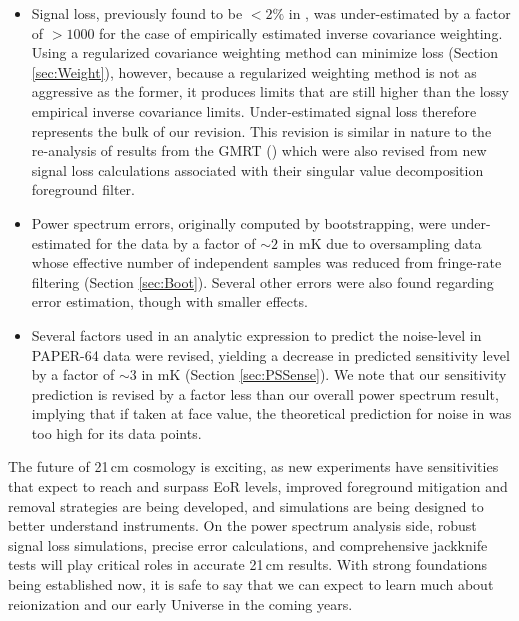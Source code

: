\documentclass[preprint2,numberedappendix,tighten]{aastex6}  %
\begin{document}
\begin{itemize}
\item Signal loss, previously found to be $<2\%$ in , was under-estimated by a factor of $>$$1000$ for the case of empirically estimated inverse 
covariance weighting. Using a regularized covariance weighting method can minimize loss (Section 
\ref{sec:Weight}), however, because a regularized weighting method is not as aggressive as the former, it produces limits that are still higher than the lossy empirical inverse covariance limits. Under-estimated signal loss therefore represents the bulk of our revision. 
This revision is similar in nature to the re-analysis of results from the GMRT (\citealt{paciga_et_al2013}) which were also 
revised from new signal loss calculations associated with their singular value decomposition foreground filter.
\item Power spectrum errors, originally computed by bootstrapping, were under-estimated for the data by a factor of $\sim2$ in mK due to oversampling data whose effective number of independent samples was reduced from fringe-rate filtering (Section \ref{sec:Boot}). Several other errors were also found regarding error estimation, though with smaller effects.
\item Several factors used in an analytic expression to predict the noise-level in PAPER-64 data were revised, yielding a 
decrease in predicted sensitivity level by a factor of $\sim3$ in mK (Section \ref{sec:PSSense}). We note that our sensitivity prediction is revised by a factor less than our overall
power spectrum result, implying that if taken at face value, the theoretical prediction for noise in  was too high for its data 
points.
\end{itemize}

The future of 21\,cm cosmology is exciting, as new experiments have sensitivities that expect to reach and surpass EoR levels, improved 
foreground mitigation and removal strategies are being developed, and simulations are being designed to better understand 
instruments. On the power spectrum analysis side, robust signal loss simulations, precise error calculations, and 
comprehensive jackknife tests will play critical roles in accurate 21\,cm results. With strong foundations being established now, it is safe to say that we can expect to learn much about reionization and our early Universe in the coming years.


\end{document}
